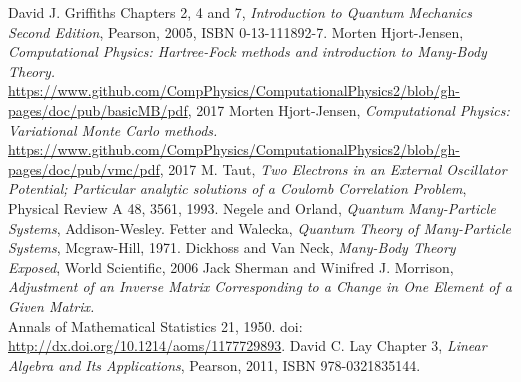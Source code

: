 \documentclass[a4paper, hidelinks, 10pt]{article}\usepackage[utf8]{inputenc}
\begin{document}
\begin{thebibliography}{}
        David J. Griffiths Chapters 2, 4 and 7,
        \textit{Introduction to Quantum Mechanics Second Edition},
        Pearson, 2005, ISBN 0-13-111892-7.
        Morten Hjort-Jensen,
        \textit{Computational Physics: Hartree-Fock methods and introduction to Many-Body Theory.} \\
        \url{https://www.github.com/CompPhysics/ComputationalPhysics2/blob/gh-pages/doc/pub/basicMB/pdf}, 2017
        Morten Hjort-Jensen,
        \textit{Computational Physics: Variational Monte Carlo methods.} \\
        \url{https://www.github.com/CompPhysics/ComputationalPhysics2/blob/gh-pages/doc/pub/vmc/pdf}, 2017
        M. Taut, 
        \textit{Two Electrons in an External Oscillator Potential; Particular analytic solutions of a Coulomb Correlation Problem},
        Physical Review A 48, 3561, 1993.
        Negele and Orland,
        \textit{Quantum Many-Particle Systems},
        Addison-Wesley.
        Fetter and Walecka,
        \textit{Quantum Theory of Many-Particle Systems},
        Mcgraw-Hill, 1971.
        Dickhoss and Van Neck,
        \textit{Many-Body Theory Exposed},
        World Scientific, 2006
        Jack Sherman and Winifred J. Morrison,
        \textit{Adjustment of an Inverse Matrix Corresponding to a Change in One Element of a Given Matrix.} \\
        Annals of Mathematical Statistics 21, 1950. doi: \url{http://dx.doi.org/10.1214/aoms/1177729893}.
        David C. Lay Chapter 3,
        \textit{Linear Algebra and Its Applications},
        Pearson, 2011, ISBN 978-0321835144.
\end{thebibliography}
\end{document}
